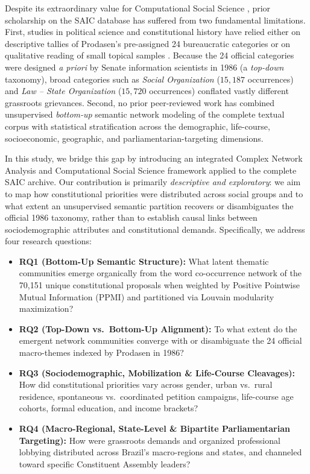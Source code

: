 \documentclass[pdflatex,sn-mathphys,iicol]{sn-jnl}
\begin{document}
Despite its extraordinary value for Computational Social Science \citep{lazer2009computational,grimmer2013text}, prior scholarship on the SAIC database has suffered from two fundamental limitations. First, studies in political science and constitutional history have relied either on descriptive tallies of Prodasen's pre-assigned 24 bureaucratic categories or on qualitative reading of small topical samples \citep{mcdonald2022making,santos2024lazer}. Because the 24 official categories were designed \textit{a priori} by Senate information scientists in 1986 (a \textit{top-down} taxonomy), broad categories such as \textit{Social Organization} ($15,187$ occurrences) and \textit{Law -- State Organization} ($15,720$ occurrences) conflated vastly different grassroots grievances. Second, no prior peer-reviewed work has combined unsupervised \textit{bottom-up} semantic network modeling of the complete textual corpus with statistical stratification across the demographic, life-course, socioeconomic, geographic, and parliamentarian-targeting dimensions.

In this study, we bridge this gap by introducing an integrated Complex Network Analysis and Computational Social Science framework applied to the complete SAIC archive. %
Our contribution is primarily \emph{descriptive and exploratory}: we aim to map how constitutional priorities were distributed across social groups and to what extent an unsupervised semantic partition recovers or disambiguates the official 1986 taxonomy, rather than to establish causal links between sociodemographic attributes and constitutional demands. Specifically, we address four research questions:
\begin{itemize}
    \item \textbf{RQ1 (Bottom-Up Semantic Structure):} What latent thematic communities emerge organically from the word co-occurrence network of the 70,151 unique constitutional proposals when weighted by Positive Pointwise Mutual Information (PPMI) and partitioned via Louvain modularity maximization?
    \item \textbf{RQ2 (Top-Down vs.\ Bottom-Up Alignment):} To what extent do the emergent network communities converge with or disambiguate the 24 official macro-themes indexed by Prodasen in 1986?
    \item \textbf{RQ3 (Sociodemographic, Mobilization \& Life-Course Cleavages):} How did constitutional priorities vary across gender, urban vs.\ rural residence, spontaneous vs.\ coordinated petition campaigns, life-course age cohorts, formal education, and income brackets?
    \item \textbf{RQ4 (Macro-Regional, State-Level \& Bipartite Parliamentarian Targeting):} How were grassroots demands and organized professional lobbying distributed across Brazil's macro-regions and states, and channeled toward specific Constituent Assembly leaders?
\end{itemize}
\end{document}
